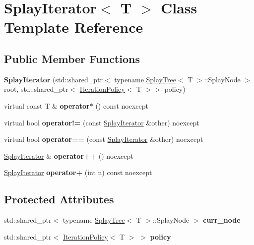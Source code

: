 \hypertarget{classSplayIterator}{}\section{Splay\+Iterator$<$ T $>$ Class Template Reference}
\label{classSplayIterator}
\subsection*{Public Member Functions}
\begin{DoxyCompactItemize}
\item 
\mbox{\label{classSplayIterator_a41a5dce71eee4a8b82025efe547ae1aa}} 
{\bfseries Splay\+Iterator} (std\+::shared\+\_\+ptr$<$ typename \hyperlink{classSplayTree}{Splay\+Tree}$<$ T $>$\+::Splay\+Node $>$ root, std\+::shared\+\_\+ptr$<$ \hyperlink{classIterationPolicy}{Iteration\+Policy}$<$ T $>$$>$ policy)
\item 
\mbox{\label{classSplayIterator_ab25826d70fa08b45174d7006b1c7f43e}} 
virtual const T \& {\bfseries operator$\ast$} () const noexcept
\item 
\mbox{\label{classSplayIterator_a7fd3ee4bfaac3622600cdf85f4752327}} 
virtual bool {\bfseries operator!=} (const \hyperlink{classSplayIterator}{Splay\+Iterator} \&other) noexcept
\item 
\mbox{\label{classSplayIterator_aa346bf707e077d808dfc3a0cc090ad69}} 
virtual bool {\bfseries operator==} (const \hyperlink{classSplayIterator}{Splay\+Iterator} \&other) noexcept
\item 
\mbox{\label{classSplayIterator_a5493e9ce13e85ac77ed47fef6fafdb0e}} 
\hyperlink{classSplayIterator}{Splay\+Iterator} \& {\bfseries operator++} () noexcept
\item 
\mbox{\label{classSplayIterator_a9566d71720c54a8c1ac4edc0117413d0}} 
\hyperlink{classSplayIterator}{Splay\+Iterator} {\bfseries operator+} (int n) const noexcept
\end{DoxyCompactItemize}
\subsection*{Protected Attributes}
\begin{DoxyCompactItemize}
\item 
\mbox{\label{classSplayIterator_a3a6e76a1cce8cb5127c68de23bbde2b6}} 
std\+::shared\+\_\+ptr$<$ typename \hyperlink{classSplayTree}{Splay\+Tree}$<$ T $>$\+::Splay\+Node $>$ {\bfseries curr\+\_\+node}
\item 
\mbox{\label{classSplayIterator_ada3c3096d608ed5e8bed651c1b9f8df6}} 
std\+::shared\+\_\+ptr$<$ \hyperlink{classIterationPolicy}{Iteration\+Policy}$<$ T $>$ $>$ {\bfseries policy}
\end{DoxyCompactItemize}
